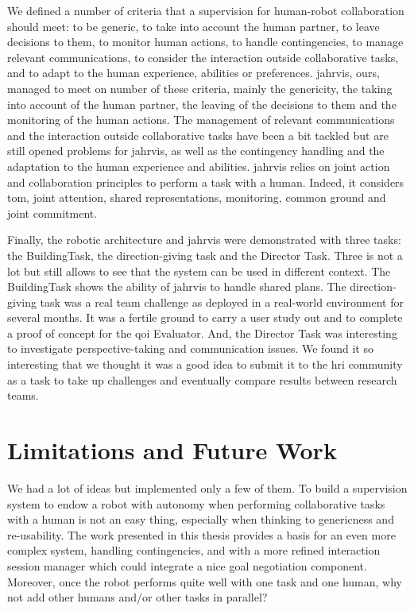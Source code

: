 \documentclass[a4paper,11pt,twoside]{StyleThese}
\begin{document}
We defined a number of criteria that a supervision for human-robot collaboration should meet: to be generic, to take into account the human partner, to leave decisions to them, to monitor human actions, to handle contingencies, to manage relevant communications, to consider the interaction outside collaborative tasks, and to adapt to the human experience, abilities or preferences. \acrfull{jahrvis}, ours, managed to meet on number of these criteria, mainly the genericity, the taking into account of the human partner, the leaving of the decisions to them and the monitoring of the human actions. The management of relevant communications and the interaction outside collaborative tasks have been a bit tackled but are still opened problems for \acrshort{jahrvis}, as well as the contingency handling and the adaptation to the human experience and abilities. \acrshort{jahrvis} relies on joint action and collaboration principles to perform a task with a human. Indeed, it considers \acrlong{tom}, joint attention, shared representations, monitoring, common ground and joint commitment.

Finally, the robotic architecture and \acrshort{jahrvis} were demonstrated with three tasks: the BuildingTask, the direction-giving task and the Director Task. Three is not a lot but still allows to see that the system can be used in different context. The BuildingTask shows the ability of \acrshort{jahrvis} to handle shared plans. The direction-giving task was a real team challenge as deployed in a real-world environment for several months. It was a fertile ground to carry a user study out and to complete a proof of concept for the \acrshort{qoi} Evaluator. And, the Director Task was interesting to investigate perspective-taking and communication issues. We found it so interesting that we thought it was a good idea to submit it to the \acrshort{hri} community as a task to take up challenges and eventually compare results between research teams.



\section*{Limitations and Future Work}

We had a lot of ideas but implemented only a few of them. To build a supervision system to endow a robot with autonomy when performing collaborative tasks with a human is not an easy thing, especially when thinking to genericness and re-usability. The work presented in this thesis provides a basis for an even more complex system, handling contingencies, and with a more refined interaction session manager which could integrate a nice goal negotiation component. Moreover, once the robot performs quite well with one task and one human, why not add other humans and/or other tasks in parallel?
\end{document}
